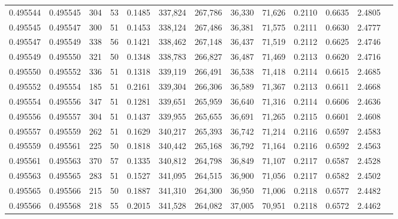 \begin{tabular}{rrrrrrrrrrrrr}
0.495544 & 0.495545 &   304 &  53 &                                     0.1485 & 337,824 & 267,786 &  36,330 &  71,626 & 0.2110 & 0.6635 & 2.4805 \\
0.495545 & 0.495547 &   300 &  51 &                                     0.1453 & 338,124 & 267,486 &  36,381 &  71,575 & 0.2111 & 0.6630 & 2.4777 \\
0.495547 & 0.495549 &   338 &  56 &                                     0.1421 & 338,462 & 267,148 &  36,437 &  71,519 & 0.2112 & 0.6625 & 2.4746 \\
0.495549 & 0.495550 &   321 &  50 &                                     0.1348 & 338,783 & 266,827 &  36,487 &  71,469 & 0.2113 & 0.6620 & 2.4716 \\
0.495550 & 0.495552 &   336 &  51 &                                     0.1318 & 339,119 & 266,491 &  36,538 &  71,418 & 0.2114 & 0.6615 & 2.4685 \\
0.495552 & 0.495554 &   185 &  51 &                                     0.2161 & 339,304 & 266,306 &  36,589 &  71,367 & 0.2113 & 0.6611 & 2.4668 \\
0.495554 & 0.495556 &   347 &  51 &                                     0.1281 & 339,651 & 265,959 &  36,640 &  71,316 & 0.2114 & 0.6606 & 2.4636 \\
0.495556 & 0.495557 &   304 &  51 &                                     0.1437 & 339,955 & 265,655 &  36,691 &  71,265 & 0.2115 & 0.6601 & 2.4608 \\
0.495557 & 0.495559 &   262 &  51 &                                     0.1629 & 340,217 & 265,393 &  36,742 &  71,214 & 0.2116 & 0.6597 & 2.4583 \\
0.495559 & 0.495561 &   225 &  50 &                                     0.1818 & 340,442 & 265,168 &  36,792 &  71,164 & 0.2116 & 0.6592 & 2.4563 \\
0.495561 & 0.495563 &   370 &  57 &                                     0.1335 & 340,812 & 264,798 &  36,849 &  71,107 & 0.2117 & 0.6587 & 2.4528 \\
0.495563 & 0.495565 &   283 &  51 &                                     0.1527 & 341,095 & 264,515 &  36,900 &  71,056 & 0.2117 & 0.6582 & 2.4502 \\
0.495565 & 0.495566 &   215 &  50 &                                     0.1887 & 341,310 & 264,300 &  36,950 &  71,006 & 0.2118 & 0.6577 & 2.4482 \\
0.495566 & 0.495568 &   218 &  55 &                                     0.2015 & 341,528 & 264,082 &  37,005 &  70,951 & 0.2118 & 0.6572 & 2.4462 \\

\end{tabular}
